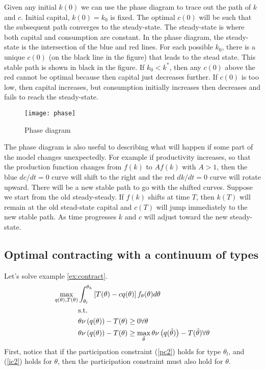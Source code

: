 Given any initial $k(0)$ we can use the phase diagram to trace out the
path of $k$ and $c$. Initial capital, $k(0) = k_0$ is fixed. The
optimal $c(0)$ will be such that the subsequent path converges to the
steady-state. The steady-state is where both capital and consumption
are constant. In the phase diagram, the steady-state is the
intersection of the blue and red lines. For each possible $k_0$, there
is a unique $c(0)$ (on the black line in the figure) that leads to the
stead state. This stable path is shown in black in the figure. If
$k_0<k^*$, then any $c(0)$ above the red cannot be optimal because
then capital just decreases further. If $c(0)$ is too low, then
capital increases, but consumption initially increases then decreases
and fails to reach the steady-state.

\begin{figure}\caption{Phase diagram \label{fig:phase}}
  \begin{minipage}{\linewidth}
    \begin{center}
      \texttt{[image: phase]}
    \end{center}
  \end{minipage}
\end{figure}

The phase diagram is also useful to describing what will happen if
some part of the model changes unexpectedly. For example if
productivity increases, so that the production function changes from
$f(k)$ to $Af(k)$ with $A>1$, then the blue $dc/dt=0$ curve will shift to
the right and the red $dk/dt=0$ curve will rotate upward. There will be a
new stable path to go with the shifted curves. Suppose we start from
the old steady-steady. If $f(k)$ shifts at time $T$, then $k(T)$ will
remain at the old stead-state capital and $c(T)$ will jump immediately
to the new stable path. As time progresses $k$ and $c$ will adjust
toward the new steady-state.


\subsection{Optimal contracting with a continuum of types} 
Let's solve example \ref{ex:contract}. 
\begin{align}
  \max_{q(\theta),T(\theta)} & \int_{\theta_l}^{\theta_h} 
  \left[T(\theta) - cq(\theta)\right]
  f_\theta(\theta) d\theta \notag \\
  & \text{s.t.} \notag \\
  &\theta \nu\left(q(\theta)\right) - T(\theta) \geq 0  \forall
  \theta \label{pc2} \\
  &\theta \nu\left(q(\theta)\right) - T(\theta) \geq
  \max_{\tilde{\theta}} \theta \nu\left(q(\tilde{\theta}) \right) -
  T(\tilde{\theta}) \forall \theta \label{ic2} 
\end{align}
First, notice that if the participation constraint (\ref{pc2}) holds for type
$\theta_l$, and (\ref{ic2}) holds for $\theta$, then the participation
constraint must also hold for $\theta$. 

